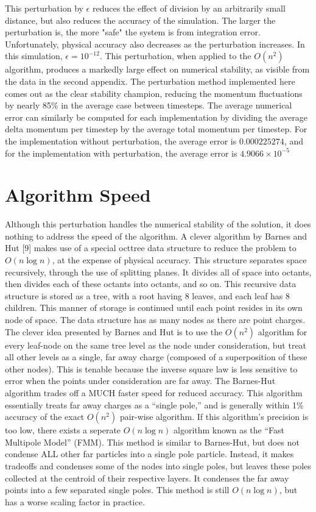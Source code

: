 \documentclass[10pt]{article}
\begin{document}
This perturbation by $\epsilon$ reduces the effect of division by an arbitrarily small distance, but also reduces the accuracy of the simulation. The larger the perturbation is, the more "safe" the system is from integration error. Unfortunately, physical accuracy also decreases as the perturbation increases. In this simulation, $\epsilon = 10^{-12}$. This perturbation, when applied to the $O(n^2)$ algorithm, produces a markedly large effect on numerical stability, as visible from the data in the second appendix. The perturbation method implemented here comes out as the clear stability champion, reducing the momentum fluctuations by nearly 85\% in the average case between timesteps. The average numerical error can similarly be computed for each implementation by dividing the average delta momentum per timestep by the average total momentum per timestep. For the implementation without perturbation, the average error is $0.000225274$, and for the implementation with perturbation, the average error is $4.9066 \times 10^{-5}$

\section{Algorithm Speed}
Although this perturbation handles the numerical stability of the solution, it does nothing to address the speed of the algorithm. A clever algorithm by Barnes and Hut [9] makes use of a special octtree data structure to reduce the problem to $O(n \log n)$, at the expense of physical accuracy. This structure separates space recursively, through the use of splitting planes. It divides all of space into octants, then divides each of these octants into octants, and so on. This recursive data structure is stored as a tree, with a root having 8 leaves, and each leaf has 8 children. This manner of storage is continued until each point resides in its own node of space. The data structure has as many nodes as there are point charges. The clever idea presented by Barnes and Hut is to use the $O(n^2)$ algorithm for every leaf-node on the same tree level as the node under consideration, but treat all other levels as a single, far away charge (composed of a superposition of these other nodes). This is tenable because the inverse square law is less sensitive to error when the points under consideration are far away. The Barnes-Hut algorithm trades off a MUCH faster speed for reduced accuracy. This algorithm essentially treats far away charges as a ``single pole,'' and is generally within 1\% accuracy of the exact $O(n^2)$ pair-wise algorithm. If this algorithm's precision is too low, there exists a seperate $O(n \log n)$ algorithm known as the ``Fast Multipole Model'' (FMM). This method is similar to Barnes-Hut, but does not condense ALL other far particles into a single pole particle. Instead, it makes tradeoffs and condenses some of the nodes into single poles, but leaves these poles collected at the centroid of their respective layers. It condenses the far away points into a few separated single poles. This method is still $O(n \log n)$, but has a worse scaling factor in practice.
\end{document}
